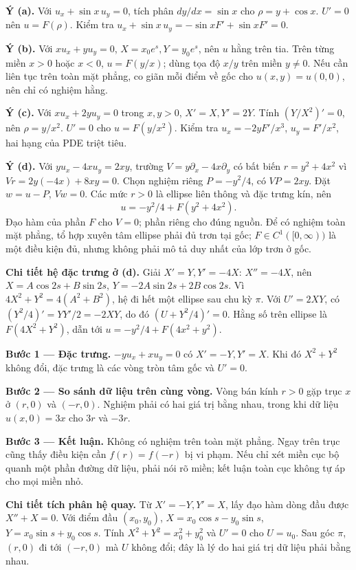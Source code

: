 \textbf{Ý (a).} Với $u_x+\sin x\,u_y=0$, tích phân $dy/dx=\sin x$ cho $\rho=y+\cos x$. $U'=0$ nên $u=F(\rho)$. Kiểm tra $u_x+\sin x\,u_y=-\sin xF'+\sin xF'=0$.

\textbf{Ý (b).} Với $xu_x+yu_y=0$, $X=x_0e^s,Y=y_0e^s$, nên $u$ hằng trên tia. Trên từng miền $x>0$ hoặc $x<0$, $u=F(y/x)$; dùng tọa độ $x/y$ trên miền $y\ne0$. Nếu cần liên tục trên toàn mặt phẳng, co giãn mỗi điểm về gốc cho $u(x,y)=u(0,0)$, nên chỉ có nghiệm hằng.

\textbf{Ý (c).} Với $xu_x+2yu_y=0$ trong $x,y>0$, $X'=X,Y'=2Y$. Tính $(Y/X^2)'=0$, nên $\rho=y/x^2$. $U'=0$ cho $u=F(y/x^2)$. Kiểm tra $u_x=-2yF'/x^3$, $u_y=F'/x^2$, hai hạng của PDE triệt tiêu.

\textbf{Ý (d).} Với $yu_x-4xu_y=2xy$, trường $V=y\partial_x-4x\partial_y$ có bất biến $r=y^2+4x^2$ vì $Vr=2y(-4x)+8xy=0$. Chọn nghiệm riêng $P=-y^2/4$, có $VP=2xy$. Đặt $w=u-P$, $Vw=0$. Các mức $r>0$ là ellipse liên thông và đặc trưng kín, nên
\[u=-y^2/4+F(y^2+4x^2).\]
Đạo hàm của phần $F$ cho $V=0$; phần riêng cho đúng nguồn. Để có nghiệm toàn mặt phẳng, tổ hợp xuyên tâm ellipse phải đủ trơn tại gốc; $F\in C^1([0,\infty))$ là một điều kiện đủ, nhưng không phải mô tả duy nhất của lớp trơn ở gốc.

\textbf{Chi tiết hệ đặc trưng ở (d).} Giải $X'=Y,Y'=-4X$: $X''=-4X$, nên $X=A\cos2s+B\sin2s$, $Y=-2A\sin2s+2B\cos2s$. Vì $4X^2+Y^2=4(A^2+B^2)$, hệ đi hết một ellipse sau chu kỳ $\pi$. Với $U'=2XY$, có $(Y^2/4)'=YY'/2=-2XY$, do đó $(U+Y^2/4)'=0$. Hằng số trên ellipse là $F(4X^2+Y^2)$, dẫn tới $u=-y^2/4+F(4x^2+y^2)$.

\textbf{Bước 1 — Đặc trưng.} $-yu_x+xu_y=0$ có $X'=-Y,Y'=X$. Khi đó $X^2+Y^2$ không đổi, đặc trưng là các vòng tròn tâm gốc và $U'=0$.

\textbf{Bước 2 — So sánh dữ liệu trên cùng vòng.} Vòng bán kính $r>0$ gặp trục $x$ ở $(r,0)$ và $(-r,0)$. Nghiệm phải có hai giá trị bằng nhau, trong khi dữ liệu $u(x,0)=3x$ cho $3r$ và $-3r$.

\textbf{Bước 3 — Kết luận.} Không có nghiệm trên toàn mặt phẳng. Ngay trên trục cũng thấy điều kiện cần $f(r)=f(-r)$ bị vi phạm. Nếu chỉ xét miền cục bộ quanh một phần đường dữ liệu, phải nói rõ miền; kết luận toàn cục không tự áp cho mọi miền nhỏ.

\textbf{Chi tiết tích phân hệ quay.} Từ $X'=-Y,Y'=X$, lấy đạo hàm dòng đầu được $X''+X=0$. Với điểm đầu $(x_0,y_0)$, $X=x_0\cos s-y_0\sin s$, $Y=x_0\sin s+y_0\cos s$. Tính $X^2+Y^2=x_0^2+y_0^2$ và $U'=0$ cho $U=u_0$. Sau góc $\pi$, $(r,0)$ đi tới $(-r,0)$ mà $U$ không đổi; đây là lý do hai giá trị dữ liệu phải bằng nhau.


